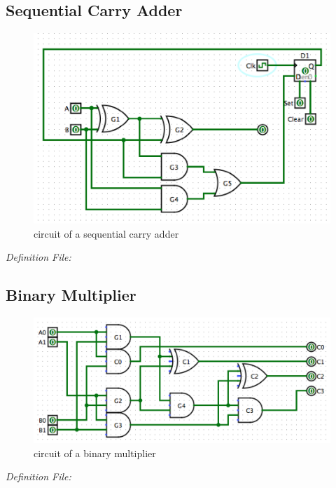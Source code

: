 \documentclass[12pt]{article}
\begin{document}
\subsection{Sequential Carry Adder}
\begin{figure}[H]
    \centering
    \includegraphics[scale=0.6]{sequential_carry_adder.png}
    \caption{circuit of a sequential carry adder}
\end{figure}

\emph{Definition File:}



\subsection{Binary Multiplier}
\begin{figure}[H]
    \centering
    \includegraphics[scale=0.6]{bin_multiplier.png}
    \caption{circuit of a binary multiplier}
\end{figure}

\emph{Definition File:}

\end{document}
